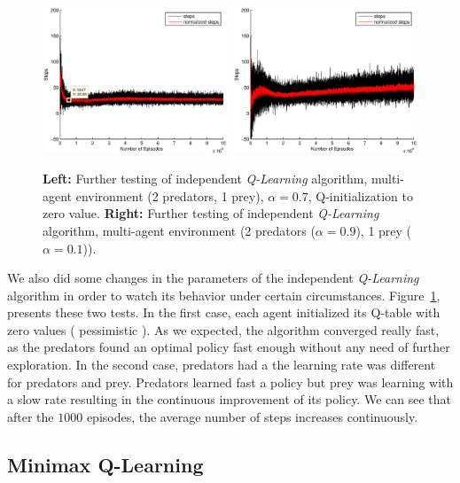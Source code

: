 \documentclass[a4paper,11pt]{article}
\begin{document}
\begin{figure}[ht!]
  \centering
    \includegraphics[width=0.49\textwidth]{figures/q2init.eps}\	
    \includegraphics[width=0.49\textwidth]{figures/q2learnfast.eps}
    \caption{\textbf{Left:} Further testing of independent \textit{Q-Learning} algorithm, multi-agent environment (2 predators, 1 prey), $\alpha = 0.7$, Q-initialization to zero value. \textbf{Right:} Further testing of independent \textit{Q-Learning} algorithm, multi-agent environment (2 predators ($\alpha = 0.9$), 1 prey ($\alpha = 0.1$)).}
    \label{qtest}
\end{figure}

We also did some changes in the parameters of the independent \textit{Q-Learning} algorithm in order to watch its behavior under certain circumstances. Figure~\ref{qtest}, presents these two tests. In the first case, each agent initialized its Q-table with zero values ( pessimistic ). As we expected, the algorithm converged really fast, as the predators found an optimal policy fast enough without any need of further exploration. In the second case, predators had a the learning rate was different for predators and prey. Predators learned fast a policy but prey was learning with a slow rate resulting in the continuous improvement of its policy. We can see that after the $1000$ episodes, the average number of steps increases continuously.


\subsection{Minimax Q-Learning}
\end{document}
